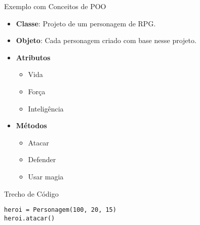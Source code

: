 \begin{frame}[fragile]{Exemplo com Conceitos de POO}

\begin{itemize}
    \item \textbf{Classe}:
Projeto de um personagem de RPG.
\item \textbf{Objeto}:
Cada personagem criado com base nesse projeto.
\end{itemize}

\begin{itemize}
    \item \textbf{Atributos}
    \begin{itemize}
    \item Vida
    \item Força
    \item Inteligência 
    \end{itemize}
    \item \textbf{Métodos}
    \begin{itemize}
    \item Atacar
    \item Defender
    \item Usar magia
\end{itemize}
    
\end{itemize}

\begin{exampleblock}{Trecho de Código}
\begin{verbatim}
heroi = Personagem(100, 20, 15)
heroi.atacar()
\end{verbatim}
\end{exampleblock}

\end{frame}



